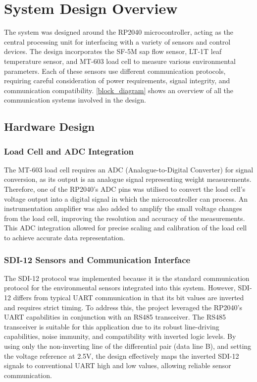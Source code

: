 
\section{System Design Overview}

The system was designed around the RP2040 microcontroller, acting as the central 
processing unit for interfacing with a variety of sensors and control devices. 
The design incorporates the SF-5M sap flow sensor, LT-1T leaf temperature sensor, 
and MT-603 load cell to measure various environmental parameters. Each of these 
sensors use different communication protocols, requiring careful consideration of 
power requirements, signal integrity, and communication compatibility. \cref{block_diagram} 
shows an overview of all the communication systems involved in the design.

\subsection{Hardware Design}

\subsubsection{Load Cell and ADC Integration}

The MT-603 load cell requires an ADC (Analogue-to-Digital Converter) for signal conversion, as its output is an analogue 
signal representing weight measurements. Therefore, one of the RP2040's ADC pins was utilised 
to convert the load cell's voltage output into a digital signal in which the microcontroller 
can process. An instrumentation amplifier was also added to amplify the small voltage changes 
from the load cell, improving the resolution and accuracy of the measurements. This ADC 
integration allowed for precise scaling and calibration of the load cell to achieve 
accurate data representation.

\subsubsection{SDI-12 Sensors and Communication Interface} 

The SDI-12 protocol was implemented because 
it is the standard communication protocol for the environmental sensors integrated into 
this system. However, SDI-12 differs from typical UART communication in that its bit 
values are inverted and requires strict timing. To address this, the project leveraged 
the RP2040's UART capabilities in conjunction with an RS485 transceiver. The RS485 
transceiver is suitable for this application due to its robust line-driving capabilities, 
noise immunity, and compatibility with inverted logic levels. By using only the non-inverting 
line of the differential pair (data line B), and setting the voltage reference at 2.5V, the design 
effectively maps the inverted SDI-12 signals to conventional UART high and low values, 
allowing reliable sensor communication.

